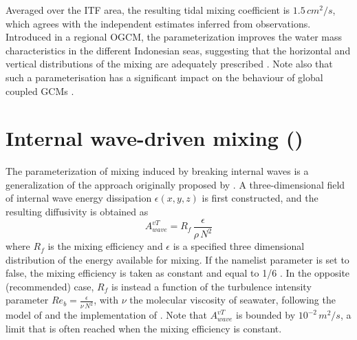 \documentclass[../tex_main/NEMO_manual]{subfiles}
\begin{document}
Averaged over the ITF area, the resulting tidal mixing coefficient is $1.5\,cm^2/s$, 
which agrees with the independent estimates inferred from observations. 
Introduced in a regional OGCM, the parameterization improves the water mass 
characteristics in the different Indonesian seas, suggesting that the horizontal 
and vertical distributions of the mixing are adequately prescribed 
\citep{Koch-Larrouy_al_GRL07, Koch-Larrouy_al_OD08a, Koch-Larrouy_al_OD08b}.
Note also that such a parameterisation has a significant impact on the behaviour 
of global coupled GCMs \citep{Koch-Larrouy_al_CD10}.


\section{Internal wave-driven mixing (\protect{})}
\label{sec:ZDF_tmx_new}


The parameterization of mixing induced by breaking internal waves is a generalization 
of the approach originally proposed by \citet{St_Laurent_al_GRL02}. 
A three-dimensional field of internal wave energy dissipation $\epsilon(x,y,z)$ is first constructed, 
and the resulting diffusivity is obtained as 
\begin{equation} \label{eq:Kwave}
A^{vT}_{wave} =  R_f \,\frac{ \epsilon }{ \rho \, N^2 }
\end{equation}
where $R_f$ is the mixing efficiency and $\epsilon$ is a specified three dimensional distribution 
of the energy available for mixing. If the  namelist parameter is set to false, 
the mixing efficiency is taken as constant and equal to 1/6 \citep{Osborn_JPO80}. 
In the opposite (recommended) case, $R_f$ is instead a function of the turbulence intensity parameter 
$Re_b = \frac{ \epsilon}{\nu \, N^2}$, with $\nu$ the molecular viscosity of seawater, 
following the model of \cite{Bouffard_Boegman_DAO2013} 
and the implementation of \cite{de_lavergne_JPO2016_efficiency}.
Note that $A^{vT}_{wave}$ is bounded by $10^{-2}\,m^2/s$, a limit that is often reached when the mixing efficiency is constant.
\end{document}
